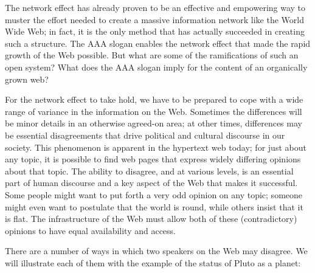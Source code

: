 The network effect has already proven to be an effective and empowering
way to muster the effort needed to create a massive information network
like the World Wide Web; in fact, it is the only method that has
actually succeeded in creating such a structure. The AAA slogan enables
the network effect that made the rapid growth of the Web possible. But
what are some of the ramifications of such an open system? What does the
AAA slogan imply for the content of an organically grown web?

For the network effect to take hold, we have to be prepared to cope with
a wide range of variance in the information on the Web. Sometimes the
differences will be minor details in an otherwise agreed-on area; at
other times, differences may be essential disagreements that drive
political and cultural discourse in our society. This phenomenon is
apparent in the hypertext web today; for just about any topic, it is
possible to find web pages that express widely differing opinions about
that topic. The ability to disagree, and at various levels, is an
essential part of human discourse and a key aspect of the Web that makes
it successful. Some people might want to put forth a very odd opinion on
any topic; someone might even want to postulate that the world is round,
while others insist that it is flat. The infrastructure of the Web must
allow both of these (contradictory) opinions to have equal availability
and access.

There are a number of ways in which two speakers on the Web may
disagree. We will illustrate each of them with the example of the status
of Pluto as a planet:


